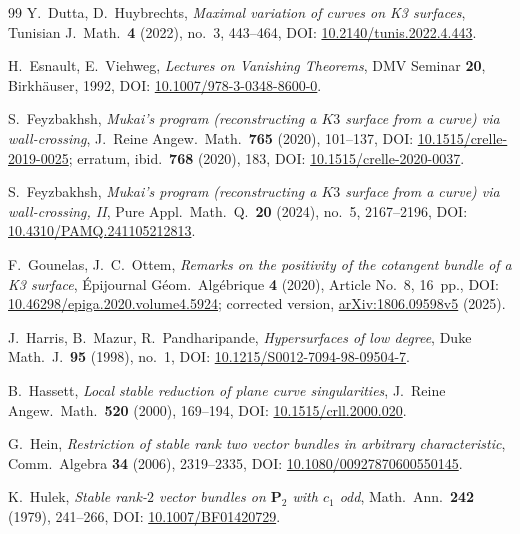 \documentclass[a4paper,12pt,twoside,reqno]{amsart}
\numberwithin{equation}{section}
\theoremstyle{plain}
\theoremstyle{definition}
\newcommand{\PP}{\mathbf{P}}
\theoremstyle{plain}
\theoremstyle{definition}
\begin{document}
\begin{thebibliography}{99}
Y.~Dutta, D.~Huybrechts, \emph{Maximal variation of curves on K3 surfaces}, Tunisian J.\ Math.\ \textbf{4} (2022), no.~3, 443--464, DOI: \href{https://doi.org/10.2140/tunis.2022.4.443}{10.2140/tunis.2022.4.443}.



H.~Esnault, E.~Viehweg, \emph{Lectures on Vanishing Theorems}, DMV Seminar \textbf{20}, Birkh\"auser, 1992, DOI: \href{https://doi.org/10.1007/978-3-0348-8600-0}{10.1007/978-3-0348-8600-0}.

S.~Feyzbakhsh, \emph{Mukai's program (reconstructing a $K3$ surface from a curve) via wall-crossing}, J.\ Reine Angew.\ Math.\ \textbf{765} (2020), 101--137, DOI: \href{https://doi.org/10.1515/crelle-2019-0025}{10.1515/crelle-2019-0025}; erratum, ibid.\ \textbf{768} (2020), 183, DOI: \href{https://doi.org/10.1515/crelle-2020-0037}{10.1515/crelle-2020-0037}.

S.~Feyzbakhsh, \emph{Mukai's program (reconstructing a $K3$ surface from a curve) via wall-crossing, II}, Pure Appl.\ Math.\ Q.\ \textbf{20} (2024), no.~5, 2167--2196, DOI: \href{https://doi.org/10.4310/PAMQ.241105212813}{10.4310/PAMQ.241105212813}.

F.~Gounelas, J.~C.~Ottem, \emph{Remarks on the positivity of the cotangent bundle of a K3 surface}, \'Epijournal G\'eom.\ Alg\'ebrique \textbf{4} (2020), Article No.~8, 16~pp., DOI: \href{https://doi.org/10.46298/epiga.2020.volume4.5924}{10.46298/epiga.2020.volume4.5924}; corrected version, \href{https://arxiv.org/abs/1806.09598v5}{arXiv:1806.09598v5} (2025).

J.~Harris, B.~Mazur, R.~Pandharipande, \emph{Hypersurfaces of low degree}, Duke Math.\ J.\ \textbf{95} (1998), no.~1, DOI: \href{https://doi.org/10.1215/S0012-7094-98-09504-7}{10.1215/S0012-7094-98-09504-7}.

B.~Hassett, \emph{Local stable reduction of plane curve singularities}, J.\ Reine Angew.\ Math.\ \textbf{520} (2000), 169--194, DOI: \href{https://doi.org/10.1515/crll.2000.020}{10.1515/crll.2000.020}.

G.~Hein, \emph{Restriction of stable rank two vector bundles in arbitrary characteristic}, Comm.\ Algebra \textbf{34} (2006), 2319--2335, DOI: \href{https://doi.org/10.1080/00927870600550145}{10.1080/00927870600550145}.

K.~Hulek, \emph{Stable rank-$2$ vector bundles on $\PP_2$ with $c_1$ odd}, Math.\ Ann.\ \textbf{242} (1979), 241--266, DOI: \href{https://doi.org/10.1007/BF01420729}{10.1007/BF01420729}.


\end{thebibliography}
\end{document}
